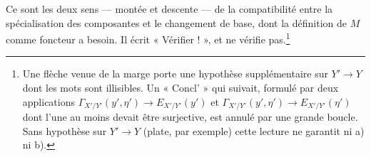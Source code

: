 \documentclass[11pt,a4paper]{article}
\begin{document}
Ce sont les deux sens --- montée et descente --- de la compatibilité entre la
spécialisation des composantes et le changement de base, dont la définition de
$M$ comme foncteur a besoin. Il écrit « Vérifier ! », et ne vérifie
pas.\footnote{Une flèche venue de la marge porte une hypothèse supplémentaire
sur $Y' \to Y$ dont les mots sont illisibles. Un « Concl' » qui suivait,
formulé par deux applications
$\Gamma_{X'/Y'}(y', \eta') \to E_{X'/Y'}(y')$ et
$\Gamma_{X'/Y'}(y', \eta') \to E_{X'/Y'}(\eta')$ dont l'une au moins devait
être surjective, est annulé par une grande boucle. Sans hypothèse sur
$Y' \to Y$ (plate, par exemple) cette lecture ne garantit ni a) ni b).}
\end{document}
